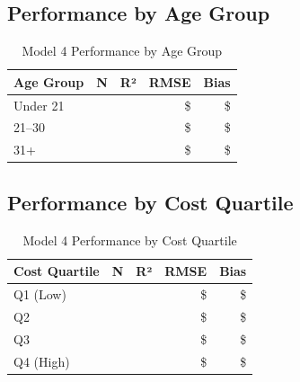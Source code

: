 \subsection{Performance by Age Group}

\begin{table}[h]
\centering
\caption{Model 4 Performance by Age Group}
\begin{tabular}{lrrrr}
\toprule
\textbf{Age Group} & \textbf{N} & \textbf{R²} & \textbf{RMSE} & \textbf{Bias} \\
\midrule
Under 21 & \ModelFourSubgroupageAgeUnderTwentyOneN{} & \ModelFourSubgroupageAgeUnderTwentyOneRSquared{} & \$\ModelFourSubgroupageAgeUnderTwentyOneRMSE{} & \$\ModelFourSubgroupageAgeUnderTwentyOneBias{} \\
21--30 & \ModelFourSubgroupageAgeTwentyOneToThirtyN{} & \ModelFourSubgroupageAgeTwentyOneToThirtyRSquared{} & \$\ModelFourSubgroupageAgeTwentyOneToThirtyRMSE{} & \$\ModelFourSubgroupageAgeTwentyOneToThirtyBias{} \\
31+ & \ModelFourSubgroupageAgeThirtyOnePlusN{} & \ModelFourSubgroupageAgeThirtyOnePlusRSquared{} & \$\ModelFourSubgroupageAgeThirtyOnePlusRMSE{} & \$\ModelFourSubgroupageAgeThirtyOnePlusBias{} \\
\bottomrule
\end{tabular}
\end{table}

\subsection{Performance by Cost Quartile}

\begin{table}[h]
\centering
\caption{Model 4 Performance by Cost Quartile}
\begin{tabular}{lrrrr}
\toprule
\textbf{Cost Quartile} & \textbf{N} & \textbf{R²} & \textbf{RMSE} & \textbf{Bias} \\
\midrule
Q1 (Low) & \ModelFourSubgroupcostQOneLowN{} & \ModelFourSubgroupcostQOneLowRSquared{} & \$\ModelFourSubgroupcostQOneLowRMSE{} & \$\ModelFourSubgroupcostQOneLowBias{} \\
Q2 & \ModelFourSubgroupcostQTwoN{} & \ModelFourSubgroupcostQTwoRSquared{} & \$\ModelFourSubgroupcostQTwoRMSE{} & \$\ModelFourSubgroupcostQTwoBias{} \\
Q3 & \ModelFourSubgroupcostQThreeN{} & \ModelFourSubgroupcostQThreeRSquared{} & \$\ModelFourSubgroupcostQThreeRMSE{} & \$\ModelFourSubgroupcostQThreeBias{} \\
Q4 (High) & \ModelFourSubgroupcostQFourHighN{} & \ModelFourSubgroupcostQFourHighRSquared{} & \$\ModelFourSubgroupcostQFourHighRMSE{} & \$\ModelFourSubgroupcostQFourHighBias{} \\
\bottomrule
\end{tabular}
\end{table}

